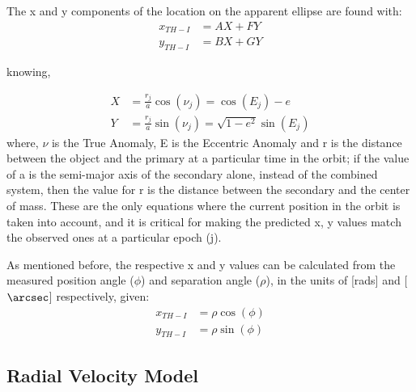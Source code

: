 \documentclass[12pt,preprint]{aastex}
\begin{document}
The x and y components of the location on the apparent ellipse are found with:
\begin{subequations}
\begin{align}\label{eq:28-1a}
x_{TH-I}& = AX+FY\\
\label{eq:28-1b}
y_{TH-I}& = BX + GY
\end{align}
\end{subequations}

knowing,

\begin{subequations}
\begin{align}\label{eq:28-1.5a}
X& = \frac{r_j}{a}\cos(\nu_j) =\cos(E_j)-e\\
\label{eq:28-1.5b}
Y& = \frac{r_j}{a}\sin(\nu_j) = \sqrt{1-e^2}\sin(E_j) 
\end{align}
\end{subequations}
where, $\nu$ is the True Anomaly, E is the Eccentric Anomaly and r is the distance between the object and the primary at a particular time in the orbit; if the value of a is the semi-major axis of the secondary alone, instead of the combined system, then the value for r is the distance between the secondary and the center of mass.  These are the only equations where the current position in the orbit is taken into account, and it is critical for making the predicted x, y values match the observed ones at a particular epoch (j).


As mentioned before, the respective x and y values can be calculated from the measured position angle ($\phi$) and separation angle ($\rho$), in the units of [rads] and [$\arcsec$] respectively, given:
\begin{subequations}
\begin{align}\label{eq:28-2a}
x_{TH-I}& = \rho \cos(\phi)\\
\label{eq:28-2b}
y_{TH-I}& = \rho \sin(\phi)
\end{align}
\end{subequations}
\pagebreak

\subsection{Radial Velocity Model}\label{sec:RV-OrbModels}
\end{document}
